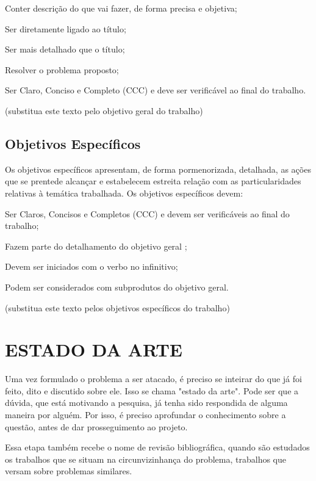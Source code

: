 Conter descrição do que vai fazer, de forma precisa e objetiva;

Ser diretamente ligado ao título;

Ser mais detalhado que o título;

Resolver o problema proposto;

Ser Claro, Conciso e Completo (CCC) e deve ser verificável ao final do trabalho.

(substitua este texto pelo objetivo geral do trabalho)

\subsection{Objetivos Específicos}
\label{subsec:objespc}
Os objetivos específicos apresentam, de forma pormenorizada, detalhada, as ações que se prentede alcançar e estabelecem estreita relação com as particularidades relativas à temática trabalhada. Os objetivos específicos devem:

Ser Claros, Concisos e Completos (CCC) e devem ser verificáveis ao final do trabalho;

Fazem parte do detalhamento do objetivo geral ;

Devem ser iniciados com o verbo no infinitivo;

Podem ser considerados com subprodutos do objetivo geral.

(substitua este texto pelos objetivos específicos do trabalho)

\section{ESTADO DA ARTE}
\label{sec:estadoarte}
Uma vez formulado o problema a ser atacado, é preciso se inteirar do que já foi feito, dito e discutido sobre ele. Isso se chama "estado da arte". Pode ser que a dúvida, que está motivando a pesquisa, já tenha sido respondida de alguma maneira por alguém. Por isso, é preciso aprofundar o conhecimento sobre a questão, antes de dar prosseguimento ao projeto.

Essa etapa também recebe o nome de revisão bibliográfica, quando são estudados os trabalhos que se situam na circunvizinhança do problema, trabalhos que versam sobre problemas similares.

